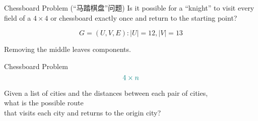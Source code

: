\begin{frame}{}
  \begin{exampleblock}{Chessboard Problem (``马踏棋盘''问题)}
    Is it possible for a ``knight'' to visit every field of
    a $4 \times 4$ or  chessboard exactly once
    and return to the starting point?
  \end{exampleblock}

  \vspace{0.50cm}
\end{frame}

\begin{frame}{}

  \[
    G = (U, V, E): |U| = 12, |V| = 13
  \]
\end{frame}

\begin{frame}{}

  \pause
  \vspace{0.20cm}
  \begin{center}
    Removing the middle  leaves  components.
  \end{center}
\end{frame}

\begin{frame}{}
  \begin{exampleblock}{Chessboard Problem}
    \[
      \textcolor{teal}{4 \times n}
    \]
  \end{exampleblock}
\end{frame}

\begin{frame}{}
  \begin{definition}
    Given a list of cities and the distances between each pair of cities, \\[3pt]
    what is the  possible route \\[3pt]
    that visits each city  and returns to the origin city?
  \end{definition}

\end{frame}

\begin{frame}{}
\end{frame}
